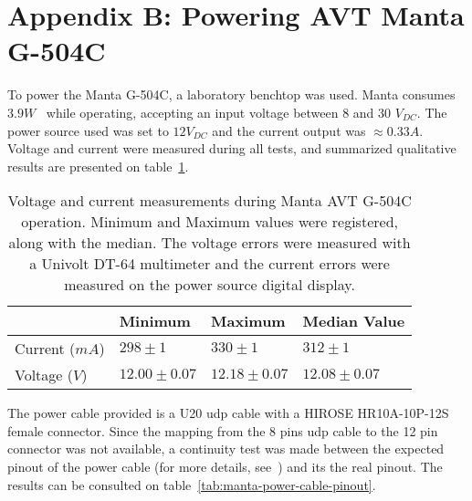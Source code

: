 \section{Appendix B: Powering AVT Manta G-504C}
\label{sec:appendix-b}

To power the Manta G-504C, a laboratory benchtop was used. Manta consumes $3.9 W$~\cite{MantaG504C} while operating, accepting an input voltage between $8$ and $30$ $V_{DC}$. The power source used was set to  $12 V_{DC}$ and the current output was $\approx 0.33A$. Voltage and current were measured during all tests, and summarized qualitative results are presented on table~\ref{tab:manta-power}. 
	
\begin{table}[!ht]
	\centering
	\renewcommand{\arraystretch}{1.2}
	\renewcommand{\tabcolsep}{0.45cm}
	\begin{tabular}{@{}llll@{}}
		\toprule
					  & Minimum & Maximum & Median Value \\ \midrule
		Current ($mA$) & $298 \pm 1$ & $330\pm 1$ & $312 \pm 1$ \\
		Voltage ($V$)  & $12.00\pm 0.07 $ & $12.18\pm 0.07$ & $12.08\pm0.07$ \\
		\bottomrule
	\end{tabular}
	\centering
	\caption[Electrical Operation conditions for Manta AVT G-504C.]{Voltage and current measurements during Manta AVT G-504C operation. Minimum and Maximum values were registered, along with the median. The voltage errors were measured with a Univolt DT-64 multimeter and the current errors were measured on the power source digital display.}
	\label{tab:manta-power}
\end{table}

The power cable provided is a U20 \ac{udp} cable with a HIROSE HR10A-10P-12S female connector. Since the mapping from the 8 pins \ac{udp} cable to the 12 pin connector was not available, a continuity test was made between the expected pinout of the power cable (for more details, see~\cite{AVTCables}) and its the real pinout. The results can be consulted on table~\ref{tab:manta-power-cable-pinout}.

